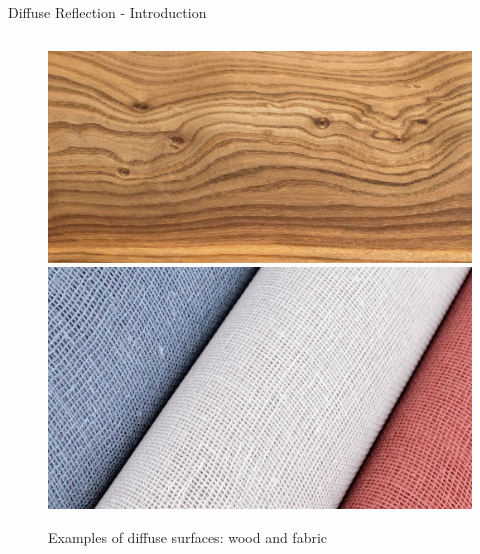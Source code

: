 \begin{frame}{Diffuse Reflection - Introduction}
\begin{columns}
\begin{column}{0.3\textwidth}
      \pause
      \vspace{0.3cm}
      \begin{center}
        \begin{figure}
          \includegraphics[width=0.8\linewidth]{images/wood.jpg}
          \includegraphics[width=0.8\linewidth]{images/fabric.png}
          \caption*{\scriptsize Examples of diffuse surfaces: wood and fabric}
        \end{figure}
      \end{center}
    \end{column}
  \end{columns}
\end{frame}

